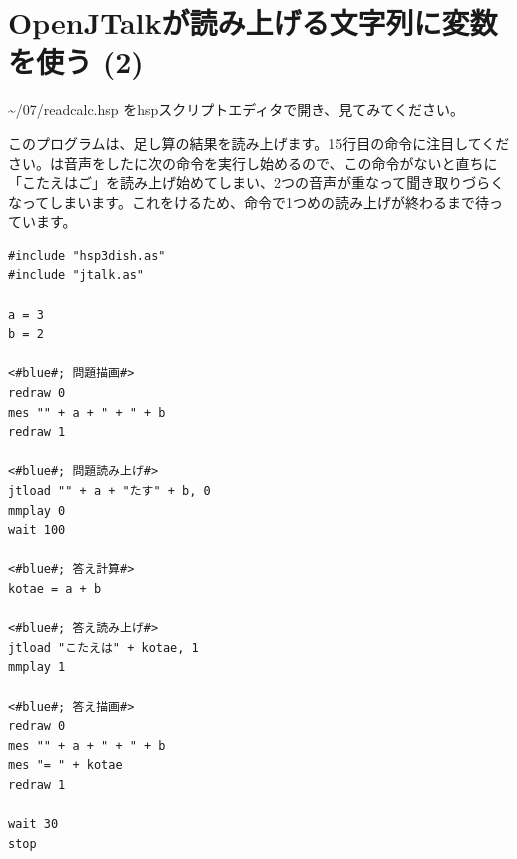 \newpage
\section{OpenJTalkが読み上げる文字列に変数を使う (2)}
 \textasciitilde /07/readcalc.hsp をhspスクリプトエディタで開き、見てみてください。

このプログラムは、足し算の結果を読み上げます。15行目の命令に注目してください。は音声をしたに次の命令を実行し始めるので、この命令がないと直ちに「こたえはご」を読み上げ始めてしまい、2つの音声が重なって聞き取りづらくなってしまいます。これをけるため、命令で1つめの読み上げが終わるまで待っています。\\

\begin{lstlisting}[caption=readcalc.hsp,label=readcalc.hsp]
#include "hsp3dish.as"
#include "jtalk.as"

a = 3
b = 2

<#blue#; 問題描画#>
redraw 0
mes "" + a + " + " + b
redraw 1

<#blue#; 問題読み上げ#>
jtload "" + a + "たす" + b, 0
mmplay 0
wait 100

<#blue#; 答え計算#>
kotae = a + b

<#blue#; 答え読み上げ#>
jtload "こたえは" + kotae, 1
mmplay 1

<#blue#; 答え描画#>
redraw 0
mes "" + a + " + " + b
mes "= " + kotae
redraw 1

wait 30
stop
\end{lstlisting}

\begin{tcolorbox}[title=\useOmetoi]
\begin{enumerate}
\end{enumerate}
\end{tcolorbox}
